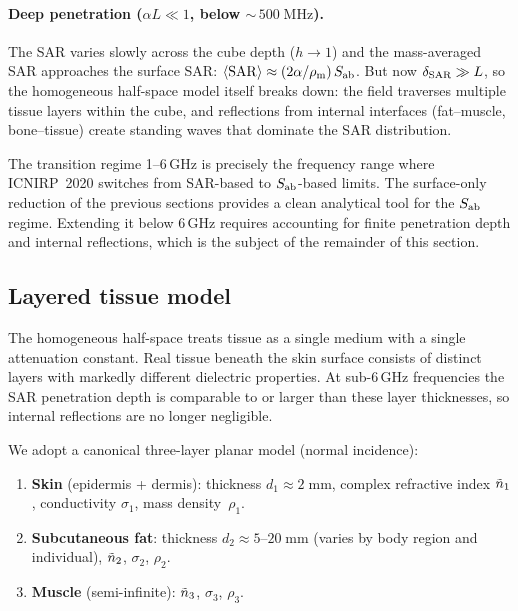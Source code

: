 \paragraph{Deep penetration ($\alpha L \ll 1$, below
  ${\sim}\,500\;\mathrm{MHz}$).}
The SAR varies slowly across the cube depth ($h \to 1$) and the
mass-averaged SAR approaches the surface SAR: $\langle\mathrm{SAR}\rangle \approx
(2\alpha/\rho_{\mathrm{m}})\,S_{\mathrm{ab}}$.  But now $\delta_{\mathrm{SAR}} \gg L$, so the
homogeneous half-space model itself breaks down: the field traverses
multiple tissue layers within the cube, and reflections from internal
interfaces (fat--muscle, bone--tissue) create standing waves that dominate
the SAR distribution.

\begin{remark}
The transition regime 1--6\,GHz is precisely the frequency range where
ICNIRP~2020 switches from SAR-based to $S_{\mathrm{ab}}$-based limits.  The
surface-only reduction of the previous sections provides
a clean analytical tool for the $S_{\mathrm{ab}}$ regime.  Extending it below
6\,GHz requires accounting for finite penetration depth and internal
reflections, which is the subject of the remainder of this section.
\end{remark}


\subsection{Layered tissue model}
\label{sec:layered}

The homogeneous half-space treats tissue as a single medium with a single
attenuation constant.  Real tissue beneath the skin surface consists of
distinct layers with markedly different dielectric properties.  At
sub-6\,GHz frequencies the SAR penetration depth is comparable to or
larger than these layer thicknesses, so internal reflections are no longer
negligible.

We adopt a canonical three-layer planar model (normal incidence):

\begin{enumerate}[nosep]
\item \textbf{Skin} (epidermis + dermis): thickness
  $d_1 \approx 2\;\mathrm{mm}$, complex refractive index $\tilde{n}_1$,
  conductivity $\sigma_1$, mass density~$\rho_1$.
\item \textbf{Subcutaneous fat}: thickness
  $d_2 \approx 5$--$20\;\mathrm{mm}$ (varies by body region and
  individual), $\tilde{n}_2$, $\sigma_2$, $\rho_2$.
\item \textbf{Muscle} (semi-infinite): $\tilde{n}_3$, $\sigma_3$, $\rho_3$.
\end{enumerate}

